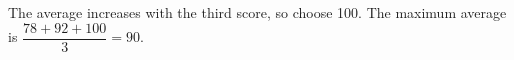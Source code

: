 The average increases with the third score, so choose 100. The maximum average is $\dfrac{78+92+100}{3}=\boxed{90}$.
